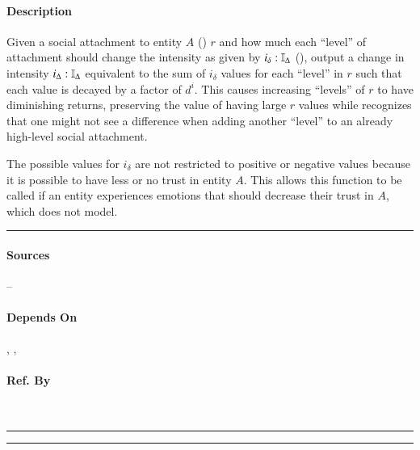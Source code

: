 \paragraph{Description} Given a social attachment to entity $A$
() $r$ and how much each ``level'' of attachment should
change the intensity as given by $ i_\delta : \mathbb{I}_{\Delta} $
(), output a change in intensity $i_\Delta :
\mathbb{I}_{\Delta}$ equivalent to the sum of $i_\delta$ values for each
``level'' in $r$ such that each value is decayed by a factor of $d^i$. This
causes increasing ``levels'' of $r$ to have diminishing returns, preserving the
value of having large $r$ values while recognizes that one might not see a
difference when adding another ``level'' to an already high-level social
attachment.

The possible values for $i_\delta$ are not restricted to positive or negative
values because it is possible to have less or no trust in entity $A$. This
allows this function to be called if an entity experiences emotions that should
decrease their trust in $A$, which \progname{} does not model. \\\hrule

\paragraph{Sources} --

\paragraph{Depends On} ,
, 

\paragraph{Ref. By}  \\\hrule\vspace{0.5mm}\hrule

~\newline

